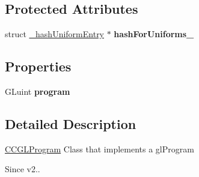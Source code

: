 \subsection*{Protected Attributes}
\begin{DoxyCompactItemize}
\item 
\hypertarget{interface_c_c_g_l_program_a79baa793f705c8391af7807c2578375e}{struct \hyperlink{struct__hash_uniform_entry}{\-\_\-hash\-Uniform\-Entry} $\ast$ {\bfseries hash\-For\-Uniforms\-\_\-}}\label{interface_c_c_g_l_program_a79baa793f705c8391af7807c2578375e}

\end{DoxyCompactItemize}
\subsection*{Properties}
\begin{DoxyCompactItemize}
\item 
\hypertarget{interface_c_c_g_l_program_a810fd3dc4113ca3f1f648ed12b488282}{G\-Luint {\bfseries program}}\label{interface_c_c_g_l_program_a810fd3dc4113ca3f1f648ed12b488282}

\end{DoxyCompactItemize}


\subsection{Detailed Description}
\hyperlink{interface_c_c_g_l_program}{C\-C\-G\-L\-Program} Class that implements a gl\-Program

\begin{DoxySince}{Since}
v2.. 
\end{DoxySince}


